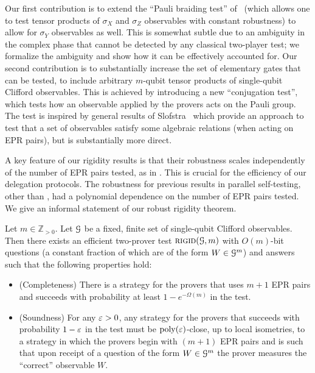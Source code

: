 Our first contribution is to extend the ``Pauli braiding test'' of~\cite{natarajan2016robust} (which allows one to test tensor products of $\sigma_X$ and $\sigma_Z$ observables with constant robustness) to allow for $\sigma_Y$ observables as well. This is somewhat subtle due to an ambiguity in the complex phase that cannot be detected by any classical two-player test; we formalize the ambiguity and show how it can be effectively accounted for. Our second contribution is to substantially increase the set of elementary gates that can be tested, to include arbitrary $m$-qubit tensor products of single-qubit Clifford observables. This is achieved by introducing a new ``conjugation test'', which tests how an observable applied by the provers acts on the Pauli group. The test is inspired by general results of Slofstra~\cite{slofstra2016tsirelson} which provide an approach to test that a set of observables satisfy some algebraic relations (when acting on EPR pairs), but is substantially more direct. 

 A key feature of our rigidity results is that their robustness scales independently of the number of EPR pairs tested, as in \cite{natarajan2016robust}. This is crucial for the efficiency of our delegation protocols. The robustness for previous results in parallel self-testing, other than \cite{natarajan2016robust}, had a polynomial dependence on the number of EPR pairs tested. We give an informal statement of our robust rigidity theorem.
 
\begin{theorem}[Informal]\label{thm:rigid-informal}
Let $m\in\mathbb{Z}_{>0}$. Let $\cal G$ be a fixed, finite set of single-qubit Clifford observables. Then there exists an efficient two-prover test $\textsc{rigid}({\cal G},m)$ with $O(m)$-bit questions (a constant fraction of which are of the form $W\in{\cal G}^m$) and answers such that the following properties hold:
\begin{itemize}[nolistsep]
\item (Completeness) There is a strategy for the provers that uses $m+1$ EPR pairs and succeeds with probability at least $1 - e^{-\Omega(m)}$ in the test.
\item (Soundness) For any $\varepsilon>0$, any strategy for the provers that succeeds with probability $1-\varepsilon$ in the test must be $\operatorname{poly}(\varepsilon)$-close, up to local isometries, to a strategy in which the provers begin with $(m+1)$ EPR pairs and is such that upon receipt of a question of the form $W\in {\cal G}^m$ the prover measures the ``correct'' observable $W$. 
\end{itemize}
\end{theorem}

